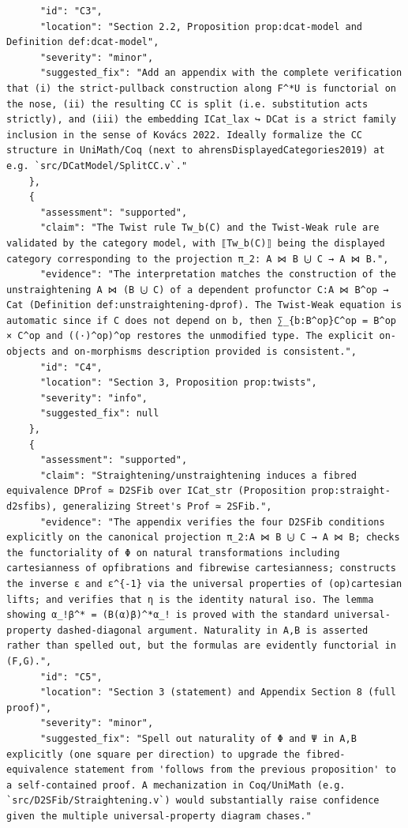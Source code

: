 \documentclass[11pt]{article}
\begin{document}
\begin{verbatim}
      "id": "C3",
      "location": "Section 2.2, Proposition prop:dcat-model and Definition def:dcat-model",
      "severity": "minor",
      "suggested_fix": "Add an appendix with the complete verification that (i) the strict-pullback construction along F^*U is functorial on the nose, (ii) the resulting CC is split (i.e. substitution acts strictly), and (iii) the embedding ICat_lax ↪ DCat is a strict family inclusion in the sense of Kovács 2022. Ideally formalize the CC structure in UniMath/Coq (next to ahrensDisplayedCategories2019) at e.g. `src/DCatModel/SplitCC.v`."
    },
    {
      "assessment": "supported",
      "claim": "The Twist rule Tw_b(C) and the Twist-Weak rule are validated by the category model, with ⟦Tw_b(C)⟧ being the displayed category corresponding to the projection π_2: A ⋈ B ⨃ C → A ⋈ B.",
      "evidence": "The interpretation matches the construction of the unstraightening A ⋈ (B ⨃ C) of a dependent profunctor C:A ⋈ B^op → Cat (Definition def:unstraightening-dprof). The Twist-Weak equation is automatic since if C does not depend on b, then ∑_{b:B^op}C^op = B^op × C^op and ((·)^op)^op restores the unmodified type. The explicit on-objects and on-morphisms description provided is consistent.",
      "id": "C4",
      "location": "Section 3, Proposition prop:twists",
      "severity": "info",
      "suggested_fix": null
    },
    {
      "assessment": "supported",
      "claim": "Straightening/unstraightening induces a fibred equivalence DProf ≃ D2SFib over ICat_str (Proposition prop:straight-d2sfibs), generalizing Street's Prof ≃ 2SFib.",
      "evidence": "The appendix verifies the four D2SFib conditions explicitly on the canonical projection π_2:A ⋈ B ⨃ C → A ⋈ B; checks the functoriality of Φ on natural transformations including cartesianness of opfibrations and fibrewise cartesianness; constructs the inverse ε and ε^{-1} via the universal properties of (op)cartesian lifts; and verifies that η is the identity natural iso. The lemma showing α_!β^* = (B(α)β)^*α_! is proved with the standard universal-property dashed-diagonal argument. Naturality in A,B is asserted rather than spelled out, but the formulas are evidently functorial in (F,G).",
      "id": "C5",
      "location": "Section 3 (statement) and Appendix Section 8 (full proof)",
      "severity": "minor",
      "suggested_fix": "Spell out naturality of Φ and Ψ in A,B explicitly (one square per direction) to upgrade the fibred-equivalence statement from 'follows from the previous proposition' to a self-contained proof. A mechanization in Coq/UniMath (e.g. `src/D2SFib/Straightening.v`) would substantially raise confidence given the multiple universal-property diagram chases."

\end{verbatim}
\end{document}
